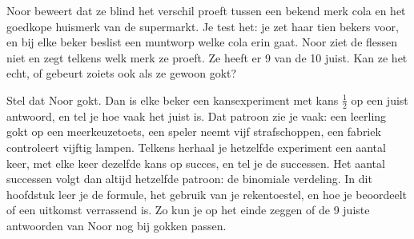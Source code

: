 %


\begin{probleem}
Noor beweert dat ze blind het verschil proeft tussen een bekend merk cola en het goedkope huismerk van de supermarkt. Je test het: je zet haar tien bekers voor, en bij elke beker beslist een muntworp welke cola erin gaat. Noor ziet de flessen niet en zegt telkens welk merk ze proeft. Ze heeft er 9 van de 10 juist. Kan ze het echt, of gebeurt zoiets ook als ze gewoon gokt?

\end{probleem}


Stel dat Noor gokt. Dan is elke beker een kansexperiment met kans $\frac12$ op een juist antwoord, en tel je hoe vaak het juist is. Dat patroon zie je vaak: een leerling gokt op een meerkeuzetoets, een speler neemt vijf strafschoppen, een fabriek controleert vijftig lampen. Telkens herhaal je hetzelfde experiment een aantal keer, met elke keer dezelfde kans op succes, en tel je de successen. Het aantal successen volgt dan altijd hetzelfde patroon: de binomiale verdeling. In dit hoofdstuk leer je de formule, het gebruik van je rekentoestel, en hoe je beoordeelt of een uitkomst verrassend is. Zo kun je op het einde zeggen of de 9 juiste antwoorden van Noor nog bij gokken passen.

